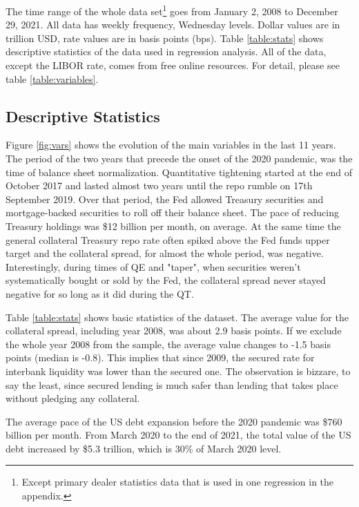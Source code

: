 \documentclass[11pt,a4paper,english,oneside]{article}
\begin{document}
The time range of the whole data set\footnote{Except primary dealer statistics data that is used in one regression in the appendix.} goes from January 2, 2008 to December 29, 2021. All data has weekly frequency, Wednesday levels. Dollar values are in trillion USD, rate values are in basis points (bps). Table \ref{table:stats} shows descriptive statistics of the data used in regression analysis. All of the data, except the LIBOR rate, comes from free online resources. For detail, please see table \ref{table:variables}.


\subsection{Descriptive Statistics}

Figure \ref{fig:vars} shows the evolution of the main variables in the last 11 years. The period of the two years that precede the onset of the 2020 pandemic, was the time of balance sheet normalization. Quantitative tightening started at the end of October 2017 and lasted almost two years until the repo rumble on 17th September 2019. Over that period, the Fed allowed Treasury securities and mortgage-backed securities to roll off their balance sheet. The pace of reducing Treasury holdings was \$12 billion per month, on average. At the same time the general collateral Treasury repo rate often spiked above the Fed funds upper target and the collateral spread, for almost the whole period, was negative. Interestingly, during times of QE and "taper", when securities weren't systematically bought or sold by the Fed, the collateral spread never stayed negative for so long as it did during the QT.

Table \ref{table:stats} shows basic statistics of the dataset. The average value for the collateral spread, including year 2008, was about 2.9 basis points. If we exclude the whole year 2008 from the sample, the average value changes to -1.5 basis points (median is -0.8). This implies that since 2009, the secured rate for interbank liquidity was lower than the secured one. The observation is bizzare, to say the least, since secured lending is much safer than lending that takes place without pledging any collateral.

The average pace of the US debt expansion before the 2020 pandemic was \$760 billion per month. From March 2020 to the end of 2021, the total value of the US debt increased by \$5.3 trillion, which is 30\% of March 2020 level.
\end{document}
